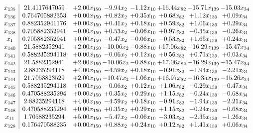 \documentclass[8pt]{article}
\begin{document}
\[\begin{array}{c| c c@{\hskip 2pt} c@{\hskip 2pt} c@{\hskip 2pt} c@{\hskip 2pt} c@{\hskip 2pt} c@{\hskip 2pt} }
 x_{135}   &  21.4117647059 & +  2.00 x_{150} & -9.94 x_{2} & -1.12 x_{10} & + 16.44 x_{82} & -15.71 x_{139} & -15.03 x_{34}\\
 x_{136}   &  0.764705882353 & +  0.00 x_{150} & +  0.82 x_{2} & +  0.35 x_{10} & +  0.68 x_{82} & +  1.12 x_{139} & +  0.09 x_{34}\\
 x_{137}   &  0.882352941176 & +  0.00 x_{150} & +  0.41 x_{2} & +  0.18 x_{10} & +  0.59 x_{82} & +  1.06 x_{139} & +  0.29 x_{34}\\
 x_{138}   &  0.705882352941 & -0.00 x_{150} & +  0.53 x_{2} & -0.06 x_{10} & +  0.97 x_{82} & -0.35 x_{139} & -0.26 x_{34}\\
 x_{1}   &  0.705882352941 & +  0.00 x_{150} & -0.47 x_{2} & -0.06 x_{10} & -0.53 x_{82} & +  1.65 x_{139} & +  0.24 x_{34}\\
 x_{140}   &  21.5882352941 & +  2.00 x_{150} & -10.06 x_{2} & -0.88 x_{10} & + 17.06 x_{82} & -16.29 x_{139} & -15.47 x_{34}\\
 x_{141}   &  0.588235294118 & +  0.00 x_{150} & -0.06 x_{2} & +  0.12 x_{10} & +  0.56 x_{82} & +  0.71 x_{139} & +  0.03 x_{34}\\
 x_{142}   &  21.5882352941 & +  2.00 x_{150} & -10.06 x_{2} & -0.88 x_{10} & + 17.06 x_{82} & -16.29 x_{139} & -15.47 x_{34}\\
 x_{143}   &  2.88235294118 & +  4.00 x_{150} & -4.59 x_{2} & +  0.18 x_{10} & -0.91 x_{82} & -1.94 x_{139} & -2.21 x_{34}\\
 x_{144}   &  21.7058823529 & +  2.00 x_{150} & -10.47 x_{2} & -1.06 x_{10} & + 16.97 x_{82} & -16.35 x_{139} & -15.26 x_{34}\\
 x_{145}   &  0.588235294118 & +  0.00 x_{150} & -0.06 x_{2} & +  0.12 x_{10} & +  1.06 x_{82} & -0.29 x_{139} & -0.47 x_{34}\\
 x_{146}   &  0.470588235294 & +  0.00 x_{150} & +  0.35 x_{2} & +  0.29 x_{10} & +  1.15 x_{82} & -0.24 x_{139} & -0.68 x_{34}\\
 x_{147}   &  2.88235294118 & +  4.00 x_{150} & -4.59 x_{2} & +  0.18 x_{10} & -0.91 x_{82} & -1.94 x_{139} & -2.21 x_{34}\\
 x_{148}   &  0.470588235294 & +  0.00 x_{150} & +  0.35 x_{2} & +  0.29 x_{10} & +  1.15 x_{82} & -0.24 x_{139} & -0.68 x_{34}\\
 x_{11}   &  1.70588235294 & +  5.00 x_{150} & -5.47 x_{2} & -0.06 x_{10} & -3.03 x_{82} & -2.35 x_{139} & -1.26 x_{34}\\
 x_{128}   &  0.176470588235 & +  0.00 x_{150} & +  0.88 x_{2} & +  0.24 x_{10} & +  0.12 x_{82} & +  1.41 x_{139} & +  0.06 x_{34}\\

\end{array}\]
\end{document}
